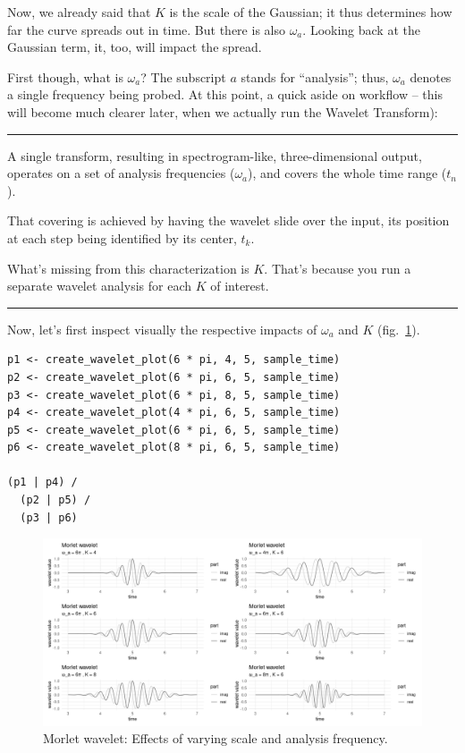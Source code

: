 \documentclass[
  letterpaper,
]{krantz}
\begin{document}
Now, we already said that \(K\) is the scale of the Gaussian; it thus
determines how far the curve spreads out in time. But there is also
\(\omega_a\). Looking back at the Gaussian term, it, too, will impact
the spread.

First though, what is \(\omega_a\)? The subscript \(a\) stands for
``analysis''; thus, \(\omega_a\) denotes a single frequency being
probed. At this point, a quick aside on workflow -- this will become
much clearer later, when we actually run the Wavelet Transform):

\begin{center}\rule{0.5\linewidth}{0.5pt}\end{center}

A single transform, resulting in spectrogram-like, three-dimensional
output, operates on a set of analysis frequencies (\(\omega_a\)), and
covers the whole time range (\(t_n\)).

That covering is achieved by having the wavelet slide over the input,
its position at each step being identified by its center, \(t_k\).

What's missing from this characterization is \(K\). That's because you
run a separate wavelet analysis for each \(K\) of interest.

\begin{center}\rule{0.5\linewidth}{0.5pt}\end{center}

Now, let's first inspect visually the respective impacts of \(\omega_a\)
and \(K\) (fig.~\ref{fig-wav-K-omega}).

\begin{verbatim}
p1 <- create_wavelet_plot(6 * pi, 4, 5, sample_time)
p2 <- create_wavelet_plot(6 * pi, 6, 5, sample_time)
p3 <- create_wavelet_plot(6 * pi, 8, 5, sample_time)
p4 <- create_wavelet_plot(4 * pi, 6, 5, sample_time)
p5 <- create_wavelet_plot(6 * pi, 6, 5, sample_time)
p6 <- create_wavelet_plot(8 * pi, 6, 5, sample_time)

(p1 | p4) /
  (p2 | p5) /
  (p3 | p6)
\end{verbatim}

\begin{figure}[H]

{\centering \includegraphics{images/wav-K-omega.png}

}

\caption{\label{fig-wav-K-omega}Morlet wavelet: Effects of varying scale
and analysis frequency.}

\end{figure}
\end{document}
